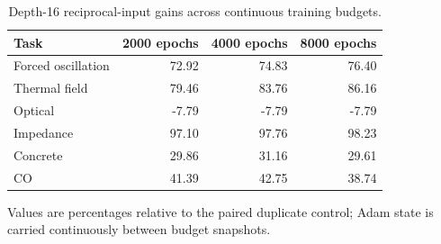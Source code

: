 \begin{table}[t]
\centering
\caption{Depth-16 reciprocal-input gains across continuous training budgets.}
\label{tab:budget-gains}
\small
\begin{tabular}{@{}lrrr@{}}
\toprule
Task & 2000 epochs & 4000 epochs & 8000 epochs \\
\midrule
Forced oscillation & 72.92 & 74.83 & 76.40 \\
Thermal field & 79.46 & 83.76 & 86.16 \\
Optical & -7.79 & -7.79 & -7.79 \\
Impedance & 97.10 & 97.76 & 98.23 \\
Concrete & 29.86 & 31.16 & 29.61 \\
CO & 41.39 & 42.75 & 38.74 \\
\bottomrule
\end{tabular}
\par\vspace{2pt}\footnotesize Values are percentages relative to the paired duplicate control; Adam state is carried continuously between budget snapshots.
\end{table}
